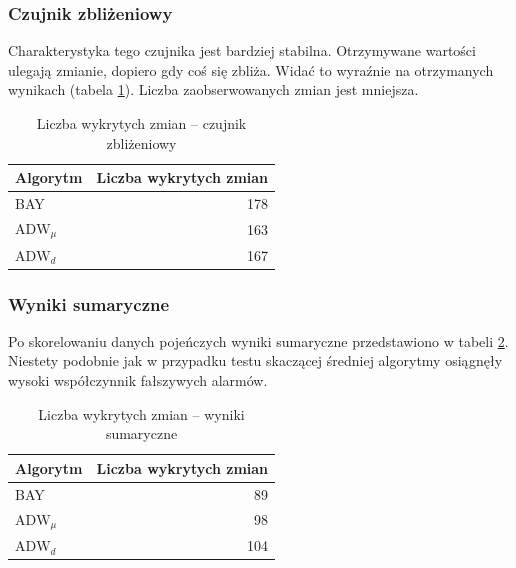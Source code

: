 \subsubsection*{Czujnik zbliżeniowy}
Charakterystyka tego czujnika jest bardziej stabilna.
Otrzymywane wartości ulegają zmianie, dopiero gdy coś się zbliża.
Widać to wyraźnie na otrzymanych wynikach (tabela \ref{tab:DistResutl}).
Liczba zaobserwowanych zmian jest mniejsza.
\begin{table}[h]
  \label{tab:DistResutl}
  \centering
  \begin{tabular}{l r }
    Algorytm & \multicolumn{1}{l}{Liczba wykrytych zmian} \\
    \hline
    BAY & 178 \\
    $\mbox{ADW}_{\mu}$ & 163 \\
    $\mbox{ADW}_{d}$ & 167\\
  \end{tabular}
  \caption{Liczba wykrytych zmian -- czujnik zbliżeniowy}
\end{table}

\subsubsection*{Wyniki sumaryczne}
Po skorelowaniu danych pojeńczych wyniki sumaryczne przedstawiono w tabeli \ref{tab:DevAllResutl}.
Niestety podobnie jak w przypadku testu skaczącej średniej algorytmy osiągnęły wysoki współczynnik fałszywych alarmów.
\begin{table}[h]
  \label{tab:DevAllResutl}
  \centering
  \begin{tabular}{l r}
    Algorytm & \multicolumn{1}{l}{Liczba wykrytych zmian} \\
    \hline
    BAY & 89 \\
    $\mbox{ADW}_{\mu}$ & 98 \\
    $\mbox{ADW}_{d}$ & 104 \\
  \end{tabular}
  \caption{Liczba wykrytych zmian -- wyniki sumaryczne}
\end{table}
